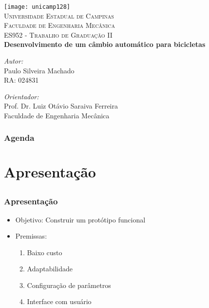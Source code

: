 \documentclass{beamer}
\begin{document}
\begin{frame}[plain]
  \begin{center}
    \texttt{[image: unicamp128]}\\[0.5cm]
    \textsc{\large Universidade Estadual de Campinas}\\%
    \textsc{\large Faculdade de Engenharia Mecânica}\\%
    \textsc{\large ES952 - Trabalho de Graduação II}\\[1.0cm]


    \textsf{  \bfseries Desenvolvimento de um câmbio automático
  para bicicletas}

    \vfill
    \begin{minipage}{0.4\textwidth}
    \begin{flushleft} \tiny
    \emph{Autor:}\\
    Paulo Silveira Machado \\
    RA: 024831
    \end{flushleft}
    \end{minipage}
    \begin{minipage}{0.4\textwidth}
    \begin{flushright} \tiny
    \emph{Orientador:} \\
    Prof. Dr. Luiz Otávio Saraiva Ferreira\\
    Faculdade de Engenharia Mecânica
    \end{flushright}
    \end{minipage}

  \end{center}

\end{frame}

\begin{frame}[plain]
  \frametitle{Agenda}
  \tableofcontents
\end{frame}


\section{Apresentação}
\subsection{}
\begin{frame}
  \frametitle{Apresentação}
  \begin{itemize}
    \item Objetivo: Construir um protótipo funcional
    \item Premissas:
    \begin{enumerate}
      \item Baixo custo
      \item Adaptabilidade
      \item Configuração de parâmetros
      \item Interface com usuário
    \end{enumerate}

  \end{itemize}

\end{frame}
\end{document}
